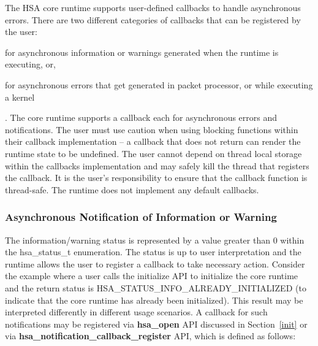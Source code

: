 \documentclass{book}
\newcommand{\reffun}[1]{\textbf{#1}}
\newcommand{\reftyp}[1]{#1}
\newcommand{\refenu}[1]{\reftyp{#1}}
\begin{document}
The HSA core runtime supports user-defined callbacks to handle
asynchronous errors. There are two different categories of callbacks
that can be registered by the user: \begin{inparaenum}[(i)] \item
for asynchronous information or warnings generated when the runtime
is executing, or, \item for asynchronous errors that get generated
in packet processor, or while executing a kernel \end{inparaenum}.
The core runtime supports a callback each for asynchronous errors
and notifications.
The user must use caution when using blocking functions within their
callback implementation -- a callback that does not return can
render the runtime state to be undefined. The user cannot depend on
thread local storage within the callbacks implementation and may
safely kill the thread that registers the callback. It is the user's
responsibility to ensure that the callback function is thread-safe.
The runtime does not implement any default callbacks.

\subsubsection{Asynchronous Notification of Information or
Warning}\label{asynnotif}
The information/warning status is represented by a value greater
than 0 within the \reftyp{hsa\_status\_t} enumeration. The status is
up to user interpretation and the runtime allows the user to
register a callback to take necessary action. Consider the example
where a user calls the initialize API to initialize the core runtime
and the return status is
\refenu{HSA\_STATUS\_INFO\_ALREADY\_INITIALIZED} (to indicate that
the core runtime has already been initialized). This result may be
interpreted differently in different usage scenarios. A callback for
such notifications may be registered via \reffun{hsa\_open} API
discussed in Section~\ref{init} or via
\reffun{hsa\_notification\_callback\_register} API, which is defined
as follows:

\makeatletter{}
\end{document}
